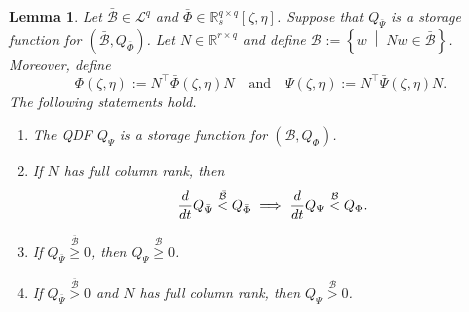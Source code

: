\documentclass[10pt,a4paper]{amsart}
\newtheorem{lemma}{Lemma}
\newcommand{\B}{\mathcal{B}}
\newcommand{\R}{\mathbb{R}}
\newcommand{\set}[2]{\left\{ #1 \;\middle| \; #2 \right\}}
\begin{document}
\begin{lemma}
	Let $\bar{\mathcal{B}} \in \mathcal{L}^q$ and $\bar{\Phi} \in \R_s^{q \times q}[\zeta,\eta]$. Suppose that $Q_{\bar{\Psi}}$ is a storage function for $(\bar{\B},Q_{\bar{\Phi}})$. Let $N\in \R^{r \times q}$ and define $\B:=\set{w}{Nw \in \bar{\B}}$. Moreover, define
	\vspace{-0.5ex}
	\begin{equation*}
		\Phi(\zeta,\eta) := N^\top \bar{\Phi}(\zeta,\eta)N \quad \text{and} \quad \Psi(\zeta,\eta) := N^\top \bar{\Psi}(\zeta,\eta)N.
	\end{equation*}
	The following statements hold.
	\begin{enumerate}[label=\roman*)]
		\item The QDF $Q_\Psi$ is a storage function for $(\B,Q_{\Phi})$. \label{lemma stat 1}
		\item If $N$ has full column rank, then 
		\[\frac{d}{dt}Q_{\bar{\Psi}} \stackrel{\bar{\B}}{<}Q_{\bar{\Phi}} \implies \frac{d}{dt}Q_\Psi \stackrel{\B}{<}Q_\Phi. \vspace{-1.5ex}\] \label{lemma stat 2}
		\item If $Q_{\bar{\Psi}} \stackrel{\bar{\B}}{\geq}0$, then $Q_\Psi \stackrel{\B}{\geq}0$. \label{lemma stat 3}
		\item If $Q_{\bar{\Psi}} \stackrel{\bar{\B}}{>}0$ and $N$ has full column rank, then $Q_\Psi \stackrel{\B}{>}0$. \label{lemma stat 4}
	\end{enumerate}
	\label{lemma barB dissipativity}
\end{lemma}
\end{document}

